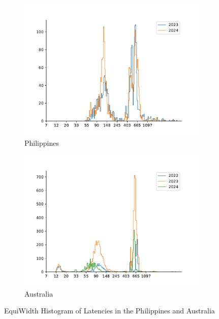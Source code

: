 \begin{figure}
	\centering
	\begin{subfigure}[b]{0.8\linewidth}
		\includegraphics[width=\linewidth]{chapters/4-results/latency/img/histogram_of_latencies_of_starlink_probes_in_Philippines.pdf}
		\caption{Philippines}
	\end{subfigure}
	\begin{subfigure}[b]{0.8\linewidth}
		\includegraphics[width=\linewidth]{chapters/4-results/latency/img/histogram_of_latencies_of_starlink_probes_in_australia.pdf}
		\caption{Australia}
	\end{subfigure}
	\caption{EquiWidth Histogram of Latencies in the Philippines and
		Australia}
	\label{fig:latency-histogram-7}
\end{figure}

